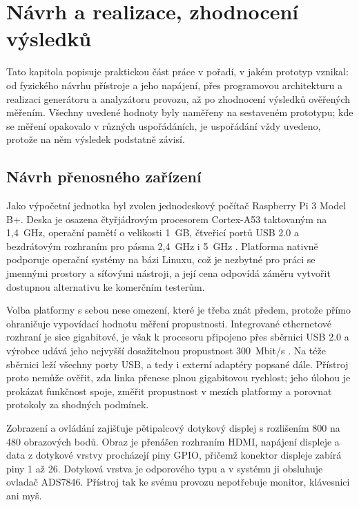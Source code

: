 \chapter{Návrh a realizace, zhodnocení výsledků}
\label{sec:realizace}

Tato kapitola popisuje praktickou část práce v pořadí, v jakém prototyp vznikal: od fyzického návrhu přístroje a jeho napájení, přes programovou architekturu a realizaci generátoru a analyzátoru provozu, až po zhodnocení výsledků ověřených měřením. Všechny uvedené hodnoty byly naměřeny na sestaveném prototypu; kde se měření opakovalo v různých uspořádáních, je uspořádání vždy uvedeno, protože na něm výsledek podstatně závisí.

\section{Návrh přenosného zařízení}
\label{sec:navrh_zarizeni}

Jako výpočetní jednotka byl zvolen jednodeskový počítač Raspberry Pi 3 Model B+. Deska je osazena čtyřjádrovým procesorem Cortex-A53 taktovaným na 1,4~GHz, operační pamětí o velikosti 1~GB, čtveřicí portů USB 2.0 a bezdrátovým rozhraním pro pásma 2,4~GHz i 5~GHz \cite{rpi3bplus}. Platforma nativně podporuje operační systémy na bázi Linuxu, což je nezbytné pro práci se jmennými prostory a síťovými nástroji, a její cena odpovídá záměru vytvořit dostupnou alternativu ke komerčním testerům.

Volba platformy s sebou nese omezení, které je třeba znát předem, protože přímo ohraničuje vypovídací hodnotu měření propustnosti. Integrované ethernetové rozhraní je sice gigabitové, je však k procesoru připojeno přes sběrnici USB 2.0 a výrobce udává jeho nejvyšší dosažitelnou propustnost 300~Mbit/s \cite{rpi3bplus}. Na téže sběrnici leží všechny porty USB, a tedy i externí adaptéry popsané dále. Přístroj proto nemůže ověřit, zda linka přenese plnou gigabitovou rychlost; jeho úlohou je prokázat funkčnost spoje, změřit propustnost v mezích platformy a porovnat protokoly za shodných podmínek.

Zobrazení a ovládání zajišťuje pětipalcový dotykový displej s rozlišením 800 na 480 obrazových bodů. Obraz je přenášen rozhraním HDMI, napájení displeje a data z dotykové vrstvy procházejí piny GPIO, přičemž konektor displeje zabírá piny 1 až 26. Dotyková vrstva je odporového typu a v systému ji obsluhuje ovladač ADS7846. Přístroj tak ke svému provozu nepotřebuje monitor, klávesnici ani myš.


